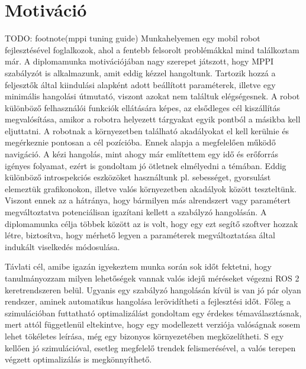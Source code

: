 \section{Motiváció}
TODO: footnote(mppi tuning guide)
Munkahelyemen egy mobil robot fejlesztésével foglalkozok, ahol a fentebb felsorolt problémákkal mind találkoztam már. A diplomamunka motivációjában nagy szerepet játszott, hogy MPPI szabályzót is alkalmazunk, amit eddig kézzel hangoltunk. Tartozik hozzá a feljesztők által kiindulási alapként adott beállított paraméterek, illetve egy minimális hangolási útmutató, viszont azokat nem találtuk elégségesnek. A robot különböző felhasználói funkciók ellátására képes, az elsődleges cél kiszállítás megvalósítása, amikor a robotra helyezett tárgyakat egyik pontból a másikba kell eljuttatni. A robotnak a környezetben található akadályokat el kell kerülnie és megérkeznie pontosan a cél pozícióba. Ennek alapja a megfelelően működő navigáció. A kézi hangolás, mint ahogy már említettem egy idő és erőforrás igényes folyamat, ezért is gondoltam jó ötletnek elmélyedni a témában. Eddig különböző introspekciós eszközöket használtunk pl. sebességet, gyorsulást elemeztük grafikonokon, illetve valós környezetben akadályok között teszteltünk. Viszont ennek az a hátránya, hogy bármilyen más alrendszert vagy paramétert megváltoztatva potenciálisan igazítani kellett a szabályzó hangolásán. A diplomamunka célja többek között az is volt, hogy egy ezt segítő szoftver hozzak létre, biztosítva, hogy mérhető legyen a paraméterek megváltoztatása által indukált viselkedés módosulása.

Távlati cél, amibe igazán igyekeztem munka során sok időt fektetni, hogy tanulmányozzam milyen lehetőségek vannak valós idejű méréseket végezni ROS 2 keretrendszeren belül. Ugyanis egy szabályzó hangolásán kívül is van jó pár olyan rendszer, aminek automatikus hangolása lerövidítheti a fejlesztési időt. Főleg a szimulációban futtatható optimalizálást gondoltam egy érdekes témaválasztásnak, mert attól függetlenül eltekintve, hogy egy modellezett verziója valóságnak sosem lehet tökéletes leírása, még egy bizonyos környezetében megközelítheti. S egy kellően jó szimulációval, esetleg megfelelő trendek felismerésével, a valós terepen végzett optimalizálás is megkönnyíthető.

